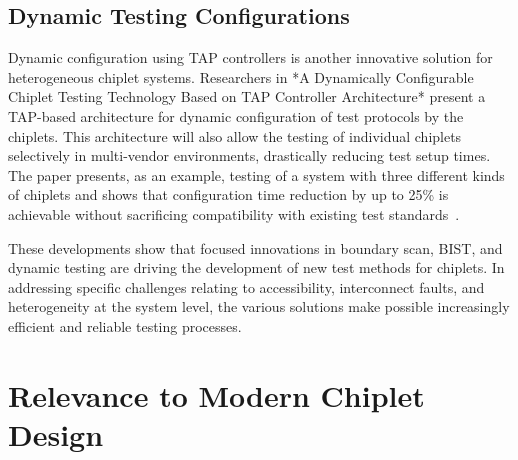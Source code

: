\documentclass[acmtog, 12pt]{acmart}
\begin{document}
\subsection*{Dynamic Testing Configurations}


Dynamic configuration using TAP controllers is another innovative solution for heterogeneous chiplet systems. Researchers in *A Dynamically Configurable Chiplet Testing Technology Based on TAP Controller Architecture* present a TAP-based architecture for dynamic configuration of test protocols by the chiplets. This architecture will also allow the testing of individual chiplets selectively in multi-vendor environments, drastically reducing test setup times. The paper presents, as an example, testing of a system with three different kinds of chiplets and shows that configuration time reduction by up to 25\% is achievable without sacrificing compatibility with existing test standards~\cite{9824550}.

These developments show that focused innovations in boundary scan, BIST, and dynamic testing are driving the development of new test methods for chiplets. In addressing specific challenges relating to accessibility, interconnect faults, and heterogeneity at the system level, the various solutions make possible increasingly efficient and reliable testing processes.


\section*{Relevance to Modern Chiplet Design}
\end{document}
